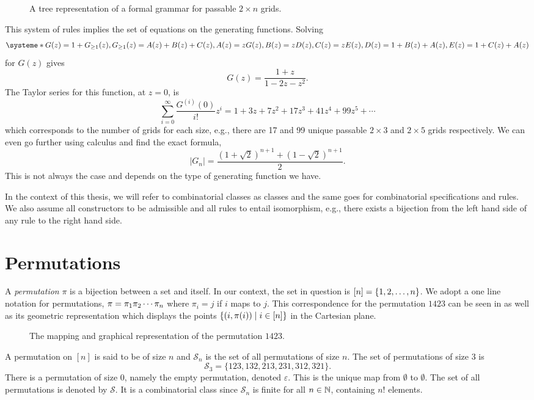 \begin{figure}[htbp]
    \centering
    
    \caption{A tree representation of a formal grammar for passable $2\times n$ grids.}
    \label{fig:gridtree}
\end{figure}

This system of rules implies the set of equations on the generating functions. Solving
\[
    \systeme*{G(z) = 1 + G_{\geq1}(z), G_{\geq1}(z) = A(z) + B(z) + C(z),A(z) = zG(z), B(z) = zD(z), C(z) = zE(z), D(z) = 1+B(z)+A(z), E(z) = 1+C(z)+A(z)}
\]
for $G(z)$ gives 
\[
    G(z) = \frac{1+z}{1-2z-z^2}.
\]
The Taylor series for this function, at $z=0$, is
\[
    \sum_{i=0}^\infty \frac{G^{(i)}(0)}{i!}z^i = 1+3z+7z^2+17z^3+ 41z^4 + 99z^5 + \dotsm
\]
which corresponds to the number of grids for each size, e.g., there are 17 and 99 unique passable $2\times3$ and $2\times5$ grids respectively. We can even go further using calculus and find the exact formula, 
\[
|G_n| = \frac{\left(1+\sqrt{2}\right)^{n+1} + \left(1-\sqrt{2}\right)^{n+1}}{2}.
\]
This is not always the case and depends on the type of generating function we have.

In the context of this thesis, we will refer to combinatorial classes as classes and the same goes for combinatorial specifications and rules. We also assume all constructors to be admissible and all rules to entail isomorphism, e.g., there exists a bijection from the left hand side of any rule to the right hand side.

\section{Permutations\label{sec:permutations}}
A \emph{permutation} $\pi$ is a bijection between a set and itself. In our context, the set in question is $[n] = \left\{1,2,\dotsc,n\right\}$. We adopt a one line notation for permutations, $\pi = \pi_1 \pi_2 \dotsm \pi_{n}$ where $\pi_i = j$ if $i$ maps to $j$. This correspondence for the permutation $1423$ can be seen in  as well as its geometric representation which displays the points $\left\{(i,\pi(i)) \mid i \in [n]\right\}$ in the Cartesian plane.

\begin{figure}[htbp]
    \centering
    
    \caption{The mapping and graphical representation of the permutation $1423$.}
    \label{fig:perm_example}
\end{figure}

A permutation on $[n]$ is said to be of size $n$ and $\mathcal{S}_n$ is the set of all permutations of size $n$. The set of permutations of size 3 is 
\[
    \mathcal{S}_3 = \{123,132,213,231,312,321\}.
\]
There is a permutation of size $0$, namely the empty permutation, denoted $\varepsilon$. This is the unique map from $\emptyset$ to $\emptyset$. The set of all permutations is denoted by $\mathcal{S}$. It is a combinatorial class since $\mathcal{S}_n$ is finite for all $n\in\mathbb{N}$, containing $n!$ elements.

